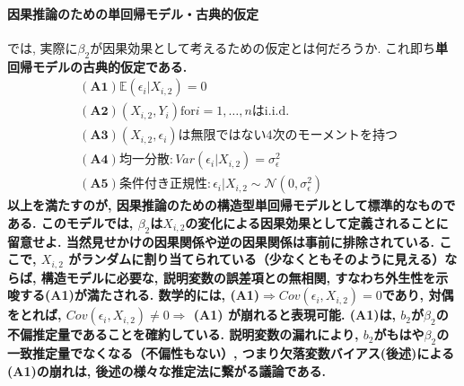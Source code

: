 \documentclass[paper=a4paper,fontsize=10pt]{jlreq}
\begin{document}
\paragraph{因果推論のための単回帰モデル・古典的仮定}
では, 実際に$\beta_2$が因果効果として考えるための仮定とは何だろうか. これ即ち\rmfamily\mcfamily\bfseries{単回帰モデルの古典的仮定}\mdseries である. 
\begin{align*}
  &\mathbf{(A1)}　 \mathbb{E}(\epsilon_i|X_{i, 2})=0\\
  &\mathbf{(A2)}　 (X_{i, 2}, Y_{i})　\text{for}　i=1, \dots, n　\text{はi.i.d.}\\
  &\mathbf{(A3)}　 (X_{i, 2}, \epsilon_{i})\text{は無限ではない4次のモーメントを持つ}\\
  &\mathbf{(A4)}　 \text{均一分散}: Var(\epsilon_i|X_{i, 2})=\sigma_\epsilon^{2}\\
  &\mathbf{(A5)}　 条件付き正規性: \epsilon_i|X_{i, 2} \sim \mathcal{N} (0, \sigma_\epsilon^{2})
\end{align*}
以上を満たすのが, 因果推論のための構造型単回帰モデルとして標準的なものである. このモデルでは, $\beta_2$は$X_{i,2}$の変化による\rmfamily\mcfamily\bfseries{因果効果}\mdseries として定義されることに留意せよ. 当然見せかけの因果関係や逆の因果関係は事前に排除されている. ここで, $X_{i,2}$ がランダムに割り当てられている（少なくともそのように見える）ならば, 構造モデルに必要な, 説明変数の誤差項との無相関, すなわち\textbf{外生性}を示唆する\rmfamily\mcfamily\bfseries{(A1)}\mdseries が満たされる. 数学的には, (A1)$\Rightarrow Cov(\epsilon_i, X_{i, 2})=0$であり, 対偶をとれば, $Cov(\epsilon_i, X_{i, 2})\neq 0\Rightarrow$ (A1) が崩れると表現可能. (A1)は, $b_2$が$\beta_2$の不偏推定量であることを確約している. 説明変数の漏れにより, $b_2$がもはや$\beta_2$の一致推定量でなくなる（不偏性もない）, つまり\rmfamily\mcfamily\bfseries{欠落変数バイアス}\mdseries (後述)による(A1)の崩れは, 後述の様々な推定法に繋がる議論である.\\
\end{document}

